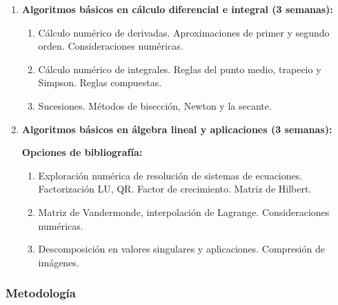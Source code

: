 \begin{refsection}
\begin{enumerate}
\item \textbf{Algoritmos básicos en cálculo diferencial e integral (3 semanas):}
\begin{enumerate} 
    \item Cálculo numérico de derivadas. Aproximaciones de primer y segundo orden. Consideraciones numéricas. \cite[Ejercicio 3.18]{langtangen_primer_2016}
    \item Cálculo numérico de integrales. Reglas del punto medio, trapecio y Simpson. Reglas compuestas. \cite[Sección 3.4.2, Ejercicio 3.6, 3.7, 3.8, 3.12]{langtangen_primer_2016}
    \item Sucesiones. Métodos de bisección, Newton y la secante. \cite[Sección A.1.10,Ejercicio A.10, A. 11]{langtangen_primer_2016}
\end{enumerate}

\item \textbf{Algoritmos básicos en álgebra lineal y aplicaciones (3 semanas):} 

\textbf{Opciones de bibliografía:} \cite{trefethen97}
\begin{enumerate}
    \item Exploración numérica de resolución de sistemas de ecuaciones. Factorización LU, QR. Factor de crecimiento. Matriz de Hilbert.
    \item Matriz de Vandermonde, interpolación de Lagrange. Consideraciones numéricas.
    \item Descomposición en valores singulares y aplicaciones. Compresión de imágenes. 
\end{enumerate}



\end{enumerate}

\subsubsection*{Metodología}



\end{refsection}

